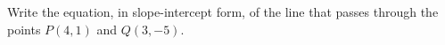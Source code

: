Write the equation, in slope-intercept form, of the line that passes through the points $P(4,1)$ and $Q(3,-5)$.
